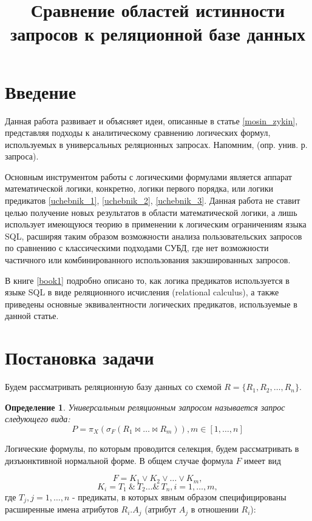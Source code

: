 \documentclass[10pt,a4paper]{article}
\title{Сравнение областей истинности запросов к реляционной базе данных}
\newtheorem{mydef}{Определение}
\begin{document}
\maketitle
\section*{Введение}
Данная работа развивает и объясняет идеи, описанные в статье \ref{mosin_zykin}, представляя подходы к аналитическому сравнению логических формул, используемых в универсальных реляционных запросах. Напомним, (опр. унив. р. запроса).

Основным инструментом работы с логическими формулами является аппарат математической логики, конкретно, логики первого порядка, или логики предикатов \ref{uchebnik_1}, \ref{uchebnik_2}, \ref{uchebnik_3}. Данная работа не ставит целью получение новых результатов в области математической логики, а лишь использует имеющуюся теорию в применении к логическим ограничениям языка SQL, расширяя таким образом возможности анализа пользовательских запросов по сравнению с классическими подходами СУБД, где нет возможности частичного или комбинированного использования закэшированных запросов.

В книге \ref{book1} подробно описано то, как логика предикатов используется в языке SQL в виде реляционного исчисления (relational calculus), а также приведены основные эквивалентности логических предикатов, используемые в данной статье.


\section{Постановка задачи}
Будем рассматривать реляционную базу данных со схемой $R = \{R_1, R_2, \dots, R_n\}$.

\begin{mydef}
	Универсальным реляционным запросом называется запрос следующего вида:
	$$P = \pi_X(\sigma_{F} (R_1 \Join \dots \Join R_m )), m \in [1, \dots, n]$$
\end{mydef}

Логические формулы, по которым проводится селекция, будем рассматривать в дизъюнктивной нормальной форме. В общем случае формула $F$ имеет вид

\begin{equation}
F = K_1 \vee K_2 \vee \dots \vee K_m ,
\label{def_F_1}
\end{equation}
\begin{equation}
K_i = T_1\ \&\ T_2 \dots \&\ T_n, i = 1, \dots, m ,
\label{def_F_2}
\end{equation}
где $T_j, j = 1, \dots, n$ - предикаты, в которых явным образом
специфицированы расширенные имена атрибутов $R_i.A_j$ (атрибут $A_j$ в отношении
$R_i$):
\end{document}
